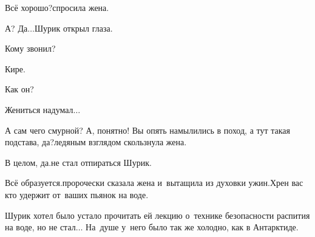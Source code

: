 {	\diagdash Всё хорошо?\mdash спросила жена.
	
	\diagdash А? Да$\ldots$\mdash Шурик открыл глаза.
	
	\diagdash Кому звонил?
	
	\diagdash Кире.
	
	\diagdash Как он? 
	
	\diagdash Жениться надумал$\ldots$ 
	
	\diagdash А сам чего смурной? А, понятно! Вы опять намылились в поход, а тут такая подстава, да?\mdash ледяным взглядом скользнула жена.
	
	\diagdash В целом, да.\mdash не стал отпираться Шурик.
	
	\diagdash Всё образуется.\mdash пророчески сказала жена и~вытащила из духовки ужин.\mdash Хрен вас кто удержит от~ваших пьянок на воде.
	
	Шурик хотел было устало прочитать ей лекцию о~технике безопасности распития на воде, но не стал$\ldots$  На~душе у~него было так же холодно, как в Антарктиде. 
	
}

